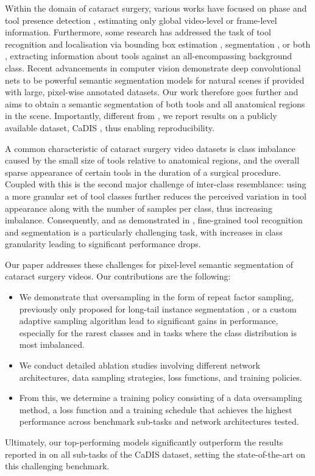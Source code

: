 \documentclass[runningheads]{llncs}
\begin{document}
Within the domain of cataract surgery, various works have focused on phase and tool presence detection \cite{CATARACTS_workflow,Padoy2012,MoritaPhase,DeepPhase,PhaseJAMA}, estimating only global video-level or frame-level information. Furthermore, some research has addressed the task of tool recognition and localisation via bounding box estimation \cite{CataractTools2}, segmentation \cite{CataractTools1}, or both \cite{CaDIS_tool_segmentation}, extracting information about tools against an all-encompassing background class. Recent advancements in computer vision \cite{Deeplabv3plus,OCR,UPerNet} demonstrate deep convolutional nets to be powerful semantic segmentation models for natural scenes if provided with large, pixel-wise annotated datasets. Our work therefore goes further and aims to obtain a semantic segmentation of both tools and all anatomical regions in the scene. Importantly, different from \cite{CataractTools2,CataractTools1}, we report results on a publicly available dataset, CaDIS \cite{CaDIS}, thus enabling reproducibility.

A common characteristic of cataract surgery video datasets is class imbalance caused by the small size of tools relative to anatomical regions, and the overall sparse appearance of certain tools in the duration of a surgical procedure. Coupled with this is the second major challenge of inter-class resemblance: using a more granular set of tool classes further reduces the perceived variation in tool appearance along with the number of samples per class, thus increasing imbalance. Consequently, and as demonstrated in \cite{CaDIS}, fine-grained tool recognition and segmentation is a particularly challenging task, with increases in class granularity leading to significant performance drops.

Our paper addresses these challenges for pixel-level semantic segmentation of cataract surgery videos. Our contributions are the following:
\begin{itemize}
    \item We demonstrate that oversampling in the form of repeat factor sampling, previously only proposed for long-tail instance segmentation \cite{gupta2019lvis}, or a custom adaptive sampling algorithm lead to significant gains in performance, especially for the rarest classes and in tasks where the class distribution is most imbalanced.
    \item We conduct detailed ablation studies involving different network architectures, data sampling strategies, loss functions, and training policies.
    \item From this, we determine a training policy consisting of a data oversampling method, a loss function and a training schedule that achieves the highest performance across benchmark sub-tasks and network architectures tested.
\end{itemize}
Ultimately, our top-performing models significantly outperform the results reported in \cite{CaDIS} on all sub-tasks of the CaDIS dataset, setting the state-of-the-art on this challenging benchmark.
\end{document}
